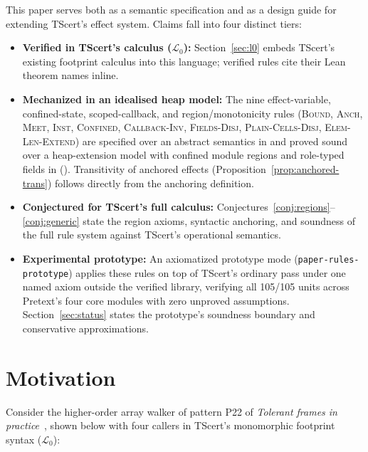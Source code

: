 \documentclass[10pt,a4paper]{article}
\newcommand{\ruleName}[1]{\textcolor{rulec}{\textsc{#1}}}
\theoremstyle{definition}
\newcommand{\code}[1]{\textcolor{codec}{\texttt{#1}}}
\newcommand{\Lang}{\mathcal{L}}
\begin{document}
This paper serves both as a semantic specification and as a design guide
for extending TScert's effect system. Claims fall into four distinct
tiers:
\begin{itemize}[leftmargin=1.5em,itemsep=2pt]
\item \textbf{Verified in TScert's calculus ($\Lang_0$):} Section~\ref{sec:l0}
  embeds TScert's existing footprint calculus into this language; verified
  rules cite their Lean theorem names inline.
\item \textbf{Mechanized in an idealised heap model:} The nine
  effect-variable, confined-state, scoped-callback, and region/monotonicity rules
  (\ruleName{Bound}, \ruleName{Anch}, \ruleName{Meet}, \ruleName{Inst},
  \ruleName{Confined}, \ruleName{Callback-Inv}, \ruleName{Fields-Disj},
  \ruleName{Plain-Cells-Disj}, \ruleName{Elem-Len-Extend})
  are specified over an abstract semantics in
   and proved sound over a
  heap-extension model with confined module regions and role-typed fields in
   ().
  Transitivity of anchored effects (Proposition~\ref{prop:anchored-trans})
  follows directly from the anchoring definition.
\item \textbf{Conjectured for TScert's full calculus:}
  Conjectures~\ref{conj:regions}--\ref{conj:generic} state the region
  axioms, syntactic anchoring, and soundness of the full rule system
  against TScert's operational semantics.
\item \textbf{Experimental prototype:} An axiomatized prototype mode
  (\code{paper-rules-prototype}) applies these rules on top of TScert's
  ordinary pass under one named axiom outside the verified library,
  verifying all 105/105 units across Pretext's four core modules with
  zero unproved assumptions. Section~\ref{sec:status} states the
  prototype's soundness boundary and conservative approximations.
\end{itemize}

\section{Motivation}\label{sec:problem}

Consider the higher-order array walker of pattern P22 of \emph{Tolerant
frames in practice}~\cite{patterns}, shown below with four callers in
TScert's monomorphic footprint syntax ($\Lang_0$):
\end{document}
